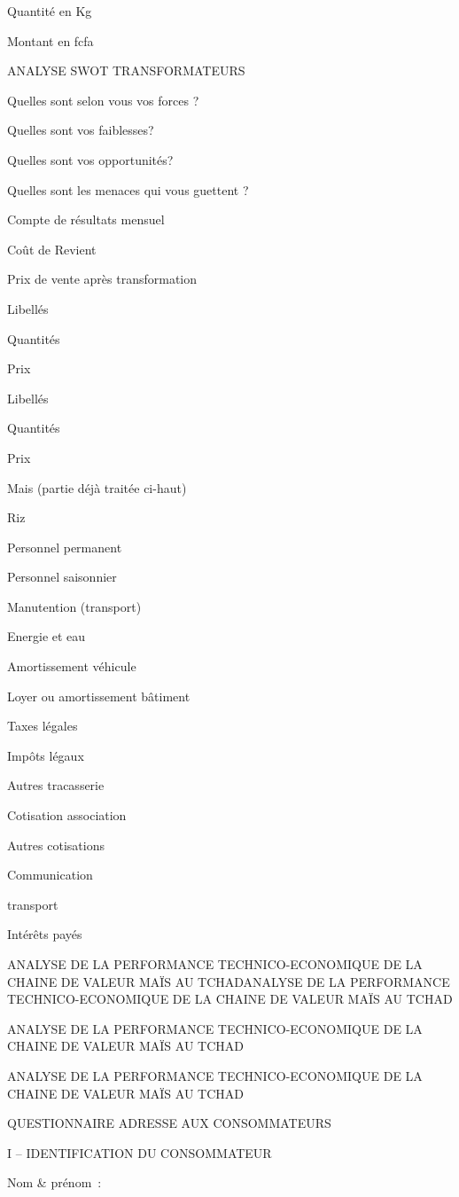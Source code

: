 \documentclass[12pt,oneside]{report}
\begin{document}
Quantité en Kg

Montant en fcfa

ANALYSE SWOT TRANSFORMATEURS

Quelles sont selon vous vos forces ?

Quelles sont vos faiblesses?

Quelles sont vos opportunités?

Quelles sont les menaces qui vous guettent ?

Compte de résultats mensuel

Coût de Revient

Prix de vente après transformation

Libellés

Quantités

Prix

Libellés

Quantités

Prix

Mais (partie déjà traitée ci-haut)

Riz

Personnel permanent

Personnel saisonnier

Manutention (transport)

Energie et eau

Amortissement véhicule

Loyer ou amortissement bâtiment

Taxes légales

Impôts légaux

Autres tracasserie

Cotisation association

Autres cotisations

Communication

transport

Intérêts payés

ANALYSE DE LA PERFORMANCE TECHNICO-ECONOMIQUE DE LA CHAINE DE VALEUR MAÏS AU TCHADANALYSE DE LA PERFORMANCE TECHNICO-ECONOMIQUE DE LA CHAINE DE VALEUR MAÏS AU TCHAD

ANALYSE DE LA PERFORMANCE TECHNICO-ECONOMIQUE DE LA CHAINE DE VALEUR MAÏS AU TCHAD

ANALYSE DE LA PERFORMANCE TECHNICO-ECONOMIQUE DE LA CHAINE DE VALEUR MAÏS AU TCHAD

QUESTIONNAIRE ADRESSE AUX CONSOMMATEURS

I – IDENTIFICATION DU CONSOMMATEUR

Nom \& prénom :
\end{document}
